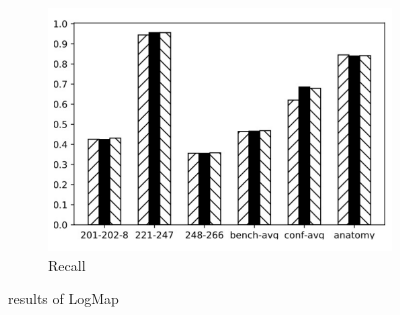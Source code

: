 \documentclass[twoside]{article}
\begin{document}
\begin{figure}[htb!]
\begin{subfigure}{0.3\textwidth}
\label{fig:MultiRegress_LogMap_P}
\end{subfigure}
\begin{subfigure}{0.3\textwidth}
	\centering
\includegraphics[width=\textwidth]{data_figs/MulRegress_LogMap_R.pdf}
\caption{Recall}
\label{fig:MultiRegress_LogMap_R}
\end{subfigure}
\caption{results of LogMap}
\end{figure}
\end{document}
